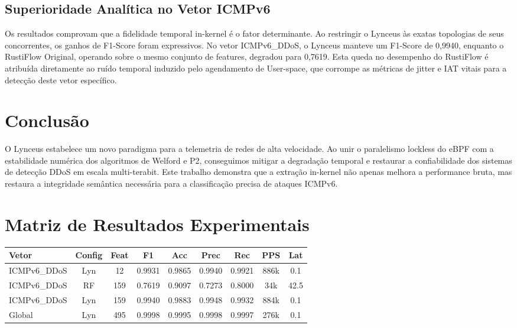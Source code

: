 \documentclass[12pt]{article}
\begin{document}
\subsection{Superioridade Analítica no Vetor ICMPv6}
Os resultados comprovam que a fidelidade temporal in-kernel é o fator determinante. Ao restringir o Lynceus às exatas topologias de seus concorrentes, os ganhos de F1-Score foram expressivos. No vetor ICMPv6\_DDoS, o Lynceus manteve um F1-Score de 0,9940, enquanto o RustiFlow Original, operando sobre o mesmo conjunto de features, degradou para 0,7619. Esta queda no desempenho do RustiFlow é atribuída diretamente ao ruído temporal induzido pelo agendamento de User-space, que corrompe as métricas de jitter e IAT vitais para a detecção deste vetor específico.

\section{Conclusão}
O Lynceus estabelece um novo paradigma para a telemetria de redes de alta velocidade. Ao unir o paralelismo lockless do eBPF com a estabilidade numérica dos algoritmos de Welford e P2, conseguimos mitigar a degradação temporal e restaurar a confiabilidade dos sistemas de detecção DDoS em escala multi-terabit. Este trabalho demonstra que a extração in-kernel não apenas melhora a performance bruta, mas restaura a integridade semântica necessária para a classificação precisa de ataques ICMPv6.




\newpage
\appendix
\section{Matriz de Resultados Experimentais}
\begin{center}
\footnotesize
\begin{tabular}{|l|c|c|c|c|c|c|c|c|}
\hline
Vetor & Config & Feat & F1 & Acc & Prec & Rec & PPS & Lat \\ \hline
ICMPv6\_DDoS & Lyn & 12 & 0.9931 & 0.9865 & 0.9940 & 0.9921 & 886k & 0.1 \\ \hline
ICMPv6\_DDoS & RF & 159 & 0.7619 & 0.9097 & 0.7273 & 0.8000 & 34k & 42.5 \\ \hline
ICMPv6\_DDoS & Lyn & 159 & 0.9940 & 0.9883 & 0.9948 & 0.9932 & 884k & 0.1 \\ \hline \hline
Global & Lyn & 495 & 0.9998 & 0.9995 & 0.9998 & 0.9997 & 276k & 0.1 \\ \hline
\end{tabular}
\end{center}
\end{document}
